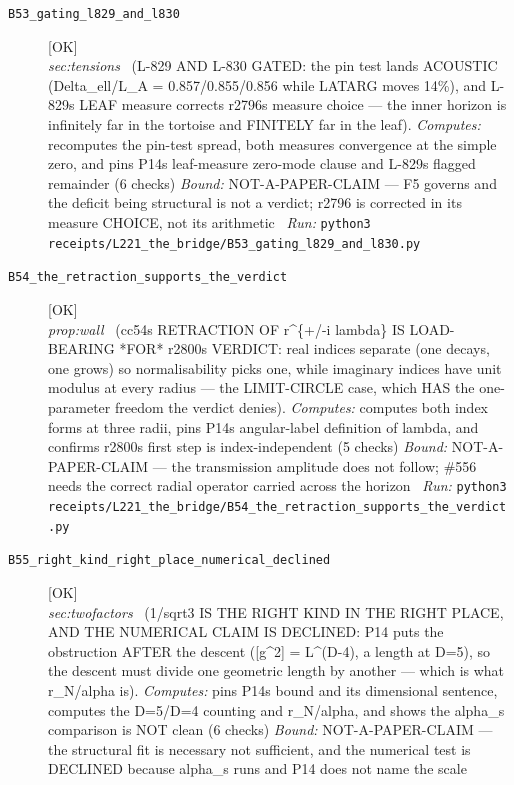 \begin{description}
\item[\label{rcpt:B53_gating_l829_and_l830}\texttt{B53\_gating\_l829\_and\_l830}]\hfill\textsf{[OK]}\\
\textit{sec:tensions} \ (L-829 AND L-830 GATED: the pin test lands ACOUSTIC (Delta\_ell/L\_A = 0.857/0.855/0.856 while LATARG moves 14\%), and L-829s LEAF measure corrects r2796s measure choice --- the inner horizon is infinitely far in the tortoise and FINITELY far in the leaf). 
\emph{Computes:} recomputes the pin-test spread, both measures convergence at the simple zero, and pins P14s leaf-measure zero-mode clause and L-829s flagged remainder (6 checks)
 \emph{Bound:} NOT-A-PAPER-CLAIM --- F5 governs and the deficit being structural is not a verdict; r2796 is corrected in its measure CHOICE, not its arithmetic
\ \emph{Run:} \texttt{python3 receipts/L221\_the\_bridge/B53\_gating\_l829\_and\_l830.py}
\item[\label{rcpt:B54_the_retraction_supports_the_verdict}\texttt{B54\_the\_retraction\_supports\_the\_verdict}]\hfill\textsf{[OK]}\\
\textit{prop:wall} \ (cc54s RETRACTION OF r\textasciicircum{}\{+/-i lambda\} IS LOAD-BEARING *FOR* r2800s VERDICT: real indices separate (one decays, one grows) so normalisability picks one, while imaginary indices have unit modulus at every radius --- the LIMIT-CIRCLE case, which HAS the one-parameter freedom the verdict denies). 
\emph{Computes:} computes both index forms at three radii, pins P14s angular-label definition of lambda, and confirms r2800s first step is index-independent (5 checks)
 \emph{Bound:} NOT-A-PAPER-CLAIM --- the transmission amplitude does not follow; \#556 needs the correct radial operator carried across the horizon
\ \emph{Run:} \texttt{python3 receipts/L221\_the\_bridge/B54\_the\_retraction\_supports\_the\_verdict.py}
\item[\label{rcpt:B55_right_kind_right_place_numerical_declined}\texttt{B55\_right\_kind\_right\_place\_numerical\_declined}]\hfill\textsf{[OK]}\\
\textit{sec:twofactors} \ (1/sqrt3 IS THE RIGHT KIND IN THE RIGHT PLACE, AND THE NUMERICAL CLAIM IS DECLINED: P14 puts the obstruction AFTER the descent ([g\textasciicircum{}2] = L\textasciicircum{}(D-4), a length at D=5), so the descent must divide one geometric length by another --- which is what r\_N/alpha is). 
\emph{Computes:} pins P14s bound and its dimensional sentence, computes the D=5/D=4 counting and r\_N/alpha, and shows the alpha\_s comparison is NOT clean (6 checks)
 \emph{Bound:} NOT-A-PAPER-CLAIM --- the structural fit is necessary not sufficient, and the numerical test is DECLINED because alpha\_s runs and P14 does not name the scale

\end{description}
